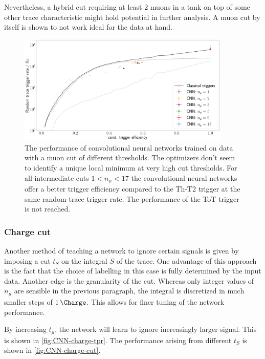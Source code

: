 Nevertheless, a hybrid cut requiring at least 2 muons in a tank on top of some other trace characteristic might hold potential in further analysis. A muon cut by
itself is shown to not work ideal for the data at hand.

\begin{figure}
	\centering
	\includegraphics[width=0.9\textwidth]{./plots/CNN_muon_cut.png}
	\caption{The performance of convolutional neural networks trained on data with a muon cut of different thresholds. The optimizers don't seem to identify a 
	unique local minimum at very high cut thresholds. For all intermediate cuts $1 < n_\mu < 17$ the convolutional neural networks offer a better trigger 
	efficiency compared to the Th-T2 trigger at the same random-trace trigger rate. The performance of the ToT trigger is not reached.}
	\label{fig:CNN-muon-cut}
\end{figure}

\subsubsection{Charge cut}
\label{sssec:charge-cut}

Another method of teaching a network to ignore certain signals is given by imposing a cut $t_S$ on the integral $S$ of the trace. One advantage of this approach is
the fact that the choice of labelling in this case is fully determined by the input data. Another edge is the granularity of the cut. Whereas only integer values 
of $n_\mu$ are sensible in the previous paragraph, the integral is discretized in much smaller steps of $\SI[per-mode=power]{1}{\per\Charge}$. This allows for 
finer tuning of the network performance.

By increasing $t_\mu$, the network will learn to ignore increasingly larger signal. This is shown in \autoref{fig:CNN-charge-tpr}. The performance arising from 
different $t_S$ is shown in \autoref{fig:CNN-charge-cut}.

